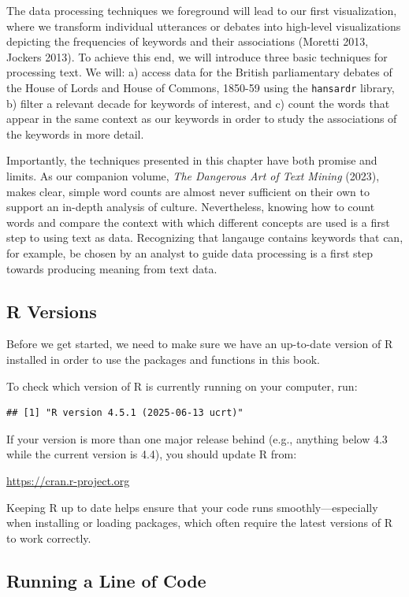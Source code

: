 \documentclass[
]{article}
\newcounter{chapter}
\begin{document}
The data processing techniques we foreground will lead to our first
visualization, where we transform individual utterances or debates into
high-level visualizations depicting the frequencies of keywords and
their associations (Moretti 2013, Jockers 2013). To achieve this end, we
will introduce three basic techniques for processing text. We will: a)
access data for the British parliamentary debates of the House of Lords
and House of Commons, 1850-59 using the \texttt{hansardr} library, b)
filter a relevant decade for keywords of interest, and c) count the
words that appear in the same context as our keywords in order to study
the associations of the keywords in more detail.

Importantly, the techniques presented in this chapter have both promise
and limits. As our companion volume, \emph{The Dangerous Art of Text
Mining} (2023), makes clear, simple word counts are almost never
sufficient on their own to support an in-depth analysis of culture.
Nevertheless, knowing how to count words and compare the context with
which different concepts are used is a first step to using text as data.
Recognizing that langauge contains keywords that can, for example, be
chosen by an analyst to guide data processing is a first step towards
producing meaning from text data.

\subsection{R Versions}\label{r-versions}

Before we get started, we need to make sure we have an up-to-date
version of R installed in order to use the packages and functions in
this book.

To check which version of R is currently running on your computer, run:

\begin{verbatim}
## [1] "R version 4.5.1 (2025-06-13 ucrt)"
\end{verbatim}

If your version is more than one major release behind (e.g., anything
below 4.3 while the current version is 4.4), you should update R from:

\url{https://cran.r-project.org}

Keeping R up to date helps ensure that your code runs
smoothly---especially when installing or loading packages, which often
require the latest versions of R to work correctly.

\subsection{Running a Line of Code}\label{running-a-line-of-code}
\end{document}

